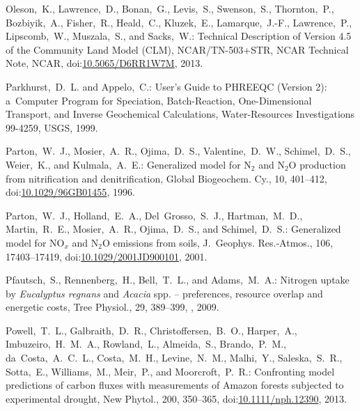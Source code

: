 \documentclass[gmd,noline]{copernicus}
\begin{document}
\begin{thebibliography}{55}
Oleson,~K., Lawrence,~D., Bonan,~G., Levis,~S., Swenson,~S., Thornton,~P., Bozbiyik,~A., Fisher,~R., Heald,~C., Kluzek,~E., Lamarque,~J.-F., Lawrence,~P., Lipscomb,~W., Muszala,~S., and Sacks,~W.:
Technical Description of Version 4.5 of the Community Land Model (CLM),
NCAR/TN-503+STR, NCAR Technical Note,
NCAR,
doi:\href{http://dx.doi.org/10.5065/D6RR1W7M}{10.5065/D6RR1W7M}, 2013.


Parkhurst,~D.~L. and Appelo,~C.:
User's Guide to PHREEQC (Version 2): a~Computer Program for Speciation, Batch-Reaction, One-Dimensional Transport, and Inverse Geochemical Calculations,
Water-Resources Investigations 99-4259,
USGS,   1999.


Parton,~W.~J., Mosier,~A.~R., Ojima,~D.~S., Valentine,~D.~W., Schimel,~D.~S., Weier,~K., and Kulmala,~A.~E.:
Generalized model for N$_2$ and N$_2$O production from nitrification and denitrification,
Global Biogeochem. Cy.,
10, 401--412,
doi:\href{http://dx.doi.org/10.1029/96GB01455}{10.1029/96GB01455}, 1996.


Parton,~W.~J., Holland,~E.~A., Del~Grosso,~S.~J., Hartman,~M.~D., Martin,~R.~E., Mosier,~A.~R., Ojima,~D.~S., and Schimel,~D.~S.:
Generalized model for NO$_x$ and N$_2$O emissions from soils,
J.~Geophys. Res.-Atmos.,
106, 17403--17419,
doi:\href{http://dx.doi.org/10.1029/2001JD900101}{10.1029/2001JD900101}, 2001.


Pfautsch,~S., Rennenberg,~H., Bell,~T.~L., and Adams,~M.~A.:
Nitrogen uptake by \textit{Eucalyptus regnans} and \textit{Acacia} spp. -- preferences, resource overlap and energetic costs,
Tree Physiol.,
29, 389--399,
, 2009.


Powell,~T.~L., Galbraith,~D.~R., Christoffersen,~B.~O., Harper,~A.,
Imbuzeiro,~H.~M.~A., Rowland,~L., Almeida,~S., Brando,~P.~M.,
da~Costa,~A.~C.~L., Costa,~M.~H., Levine,~N.~M., Malhi,~Y., Saleska,~S.~R.,
Sotta,~E., Williams,~M., Meir,~P., and Moorcroft,~P.~R.: Confronting model
predictions of carbon fluxes with measurements of Amazon forests subjected to
experimental drought, New Phytol., 200, 350--365,
doi:\href{http://dx.doi.org/10.1111/nph.12390}{10.1111/nph.12390}, 2013.




\end{thebibliography}
\end{document}
